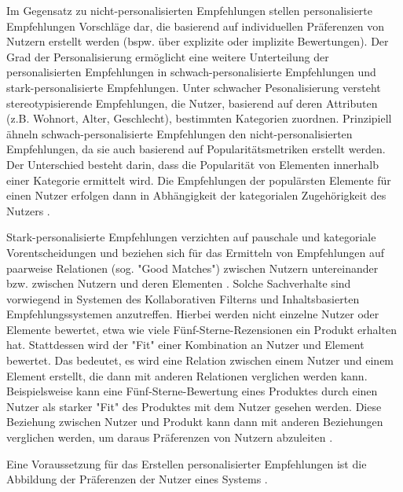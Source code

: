 Im Gegensatz zu nicht-personalisierten Empfehlungen stellen personalisierte Empfehlungen Vorschläge dar, die basierend auf individuellen Präferenzen von Nutzern erstellt werden (bspw. über explizite oder implizite Bewertungen).
Der Grad der Personalisierung ermöglicht eine weitere Unterteilung der personalisierten Empfehlungen in schwach-personalisierte Empfehlungen und stark-personalisierte Empfehlungen.
Unter schwacher Pesonalisierung versteht \textcite[S. 407]{unternährer:article} stereotypisierende Empfehlungen, die Nutzer, basierend auf deren Attributen (z.B. Wohnort, Alter, Geschlecht), bestimmten Kategorien zuordnen.
Prinzipiell ähneln schwach-personalisierte Empfehlungen den nicht-personalisierten Empfehlungen, da sie auch basierend auf Popularitätsmetriken erstellt werden.
Der Unterschied besteht darin, dass die Popularität von Elementen innerhalb einer Kategorie ermittelt wird.
Die Empfehlungen der populärsten Elemente für einen Nutzer erfolgen dann in Abhängigkeit der kategorialen Zugehörigkeit des Nutzers \cite[S. 407ff]{unternährer:article}.

Stark-personalisierte Empfehlungen verzichten auf pauschale und kategoriale Vorentscheidungen und beziehen sich für das Ermitteln von Empfehlungen auf paarweise Relationen (sog. "Good Matches") zwischen Nutzern untereinander bzw. zwischen Nutzern und deren Elementen \cite[S. 415]{unternährer:article}.
Solche Sachverhalte sind vorwiegend in Systemen des Kollaborativen Filterns und Inhaltsbasierten Empfehlungssystemen anzutreffen.
Hierbei werden nicht einzelne Nutzer oder Elemente bewertet, etwa wie viele Fünf-Sterne-Rezensionen ein Produkt erhalten hat. 
Stattdessen wird der "Fit" einer Kombination an Nutzer und Element bewertet.
Das bedeutet, es wird eine Relation zwischen einem  Nutzer und einem Element erstellt, die dann mit anderen Relationen verglichen werden kann.
Beispielsweise kann eine Fünf-Sterne-Bewertung eines Produktes durch einen Nutzer als starker "Fit" des Produktes mit dem Nutzer gesehen werden.
Diese Beziehung zwischen Nutzer und Produkt kann dann mit anderen Beziehungen verglichen werden, um daraus Präferenzen von Nutzern abzuleiten \cite[S. 417]{unternährer:article}.

Eine Voraussetzung für das Erstellen personalisierter Empfehlungen ist die Abbildung der Präferenzen der Nutzer eines Systems \cite[S. 36]{berkovsky:2:article}.

